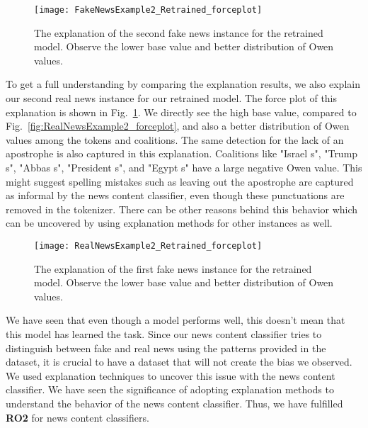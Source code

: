\begin{figure}
    \centering
    \texttt{[image: FakeNewsExample2\_Retrained\_forceplot]}
    \caption[The explanation of the second fake news instance for the retrained model.]{The explanation of the second fake news instance for the retrained model. Observe the lower base value and better distribution of Owen values.}
    \label{fig:FakeNewsExample2_Retrained_forceplot}
\end{figure}
To get a full understanding by comparing the explanation results, we also explain our second real news instance for our retrained model. The force plot of this explanation is shown in Fig.~\ref{fig:FakeNewsExample2_Retrained_forceplot}. We directly see the high base value, compared to Fig.~\ref{fig:RealNewsExample2_forceplot}, and also a better distribution of Owen values among the tokens and coalitions. The same detection for the lack of an apostrophe is also captured in this explanation. Coalitions like "Israel s", "Trump s", "Abbas s", "President s", and "Egypt s" have a large negative Owen value. This might suggest spelling mistakes such as leaving out the apostrophe are captured as informal by the news content classifier, even though these punctuations are removed in the tokenizer. There can be other reasons behind this behavior which can be uncovered by using explanation methods for other instances as well.
\begin{figure}
    \centering
    \texttt{[image: RealNewsExample2\_Retrained\_forceplot]}
    \caption[The explanation of the first fake news instance for the retrained model.]{The explanation of the first fake news instance for the retrained model. Observe the lower base value and better distribution of Owen values.}
    \label{fig:RealNewsExample2_Retrained_forceplot}
\end{figure}
We have seen that even though a model performs well, this doesn't mean that this model has learned the task. Since our news content classifier tries to distinguish between fake and real news using the patterns provided in the dataset, it is crucial to have a dataset that will not create the bias we observed. We used explanation techniques to uncover this issue with the news content classifier. We have seen the significance of adopting explanation methods to understand the behavior of the news content classifier. Thus, we have fulfilled \textbf{RO2} for news content classifiers.\\

